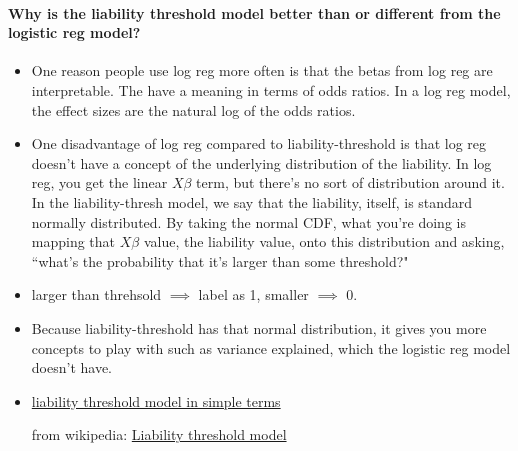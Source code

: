 \paragraph*{Why is the liability threshold model better than or different from the logistic reg model? }
\begin{itemize}
\item
	One reason people use log reg more often is that the betas from log reg are interpretable. The have a meaning in terms of odds ratios.  In a log reg model, the effect sizes are the natural log of the odds ratios.
\item
	One disadvantage of log reg compared to liability-threshold is that log reg doesn't have a concept of the underlying distribution of the liability.  In log reg, you get the linear $X\beta$ term, but there's no sort of distribution around it.  In the liability-thresh model, we say that the liability, itself, is standard normally distributed.  By taking the normal CDF, what you're doing is mapping that $X\beta$ value, the liability value, onto this distribution and asking, ``what's the probability that it's larger than some threshold?"
\item
	larger than threhsold $\implies$ label as 1, smaller $\implies$ 0.
\item
	Because liability-threshold has that normal distribution, it gives you more concepts to play with such as variance explained, which the logistic reg model doesn't have.
\item
	\href{wikilectures.eu/w/Genetic_Liability,_Threshold_Model.}{liability threshold model in simple terms}

	from wikipedia: \href{https://en.wikipedia.org/wiki/Threshold_model#Liability_threshold_model}{Liability threshold model}
\end{itemize}

